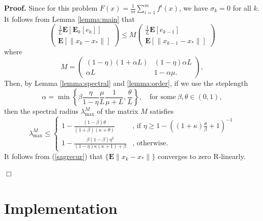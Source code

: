 \documentclass[11pt]{article}
\newcommand{\E}{\mathbf{E}}
\begin{document}
\noindent 
\textbf{Proof.}  Since for this problem $F(x) =  \frac{1}{m} \sum_{i =1}^m f^i(x) $, we have $\sigma_k=0$ for all $k$.
It follows from Lemma \ref{lemma:main} that 
\begin{equation}\label{sagrecur}
 \begin{pmatrix} \frac{1}{L}\E[\E_k[e_k]]\\ \E[\|x_k-x_\ast \|]  \end{pmatrix} 
\leq M
 \begin{pmatrix} \frac{1}{L}\E[e_{k-1}] \\ \E[\| x_{k-1}-x_\ast \|]  \end{pmatrix} 
\end{equation}
where
\begin{equation}\label{M2}
 M = \begin{pmatrix} (1-\eta)(1+\alpha  L)  &   (1-\eta)\alpha L \\  
                   \alpha L  & 1-\alpha \mu  .
                    \end{pmatrix},                   
\end{equation}
Then, by Lemma \ref{lemma:spectral} and \ref{lemma:order}, if we use the  steplength
 \begin{equation}\label{alphasag}
    \alpha = \min\left\lbrace\beta\frac{\eta}{1-\eta}\frac{\mu}{L}\frac{1}{\mu+L},\frac{\theta}{L}\right\rbrace, \quad \mbox{for some} \ \beta,\theta\in(0,1),
 \end{equation}
then the spectral radius $\lambda^M_{\max}$ of the matrix $M$  satisfies
  \begin{equation}\label{sagspec}
  \lambda^M_{\max} \leq
  \begin{cases}
    1-\displaystyle\frac{(1-\beta)\theta}{(1+\beta)(\kappa+\theta)} & \mbox{, if }\eta \geq 1-\left((1+\kappa)\frac{\theta}{\beta} + 1\right)^{-1}\\
    1-\displaystyle\frac{\beta(1-\beta)\eta^2}{(1-\eta)\kappa(\kappa+1)+\beta} & \mbox{, otherwise. }
  \end{cases}
   \end{equation}
  It follows from (\ref{sagrecur}) that $\{\E\|x_k-x_\ast\|\}$  converges to zero R-linearly.
  
  \hspace*{\fill}$\Box$\medskip


\newpage
 \section{Implementation}  \label{implementation}
\end{document}
